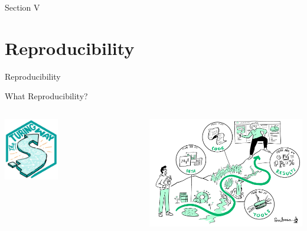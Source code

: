 \documentclass[bigger,unknownkeysallowed,aspectratio=169,red,colorblocks]{beamer}
\begin{document}
\begin{frame}[label={sec:orgb514a7e},standout]{Section V}
\section{Reproducibility}
\begin{center}
  \Huge Reproducibility
\end{center}
\end{frame}
\begin{frame}[label={sec:org91b8ea8}]{What Reproducibility?}
\begin{columns}
\begin{column}{0.4\columnwidth}

\begin{center}
\includegraphics[width=0.4\textwidth]{images/turingWay/LogoDetailWithText.jpg}
\end{center}
\end{column}

\begin{column}{0.6\columnwidth}
\begin{center}
\includegraphics[width=.9\linewidth]{images/reproducibility.jpg}
\end{center}
\end{column}
\end{columns}
\end{frame}
\end{document}
